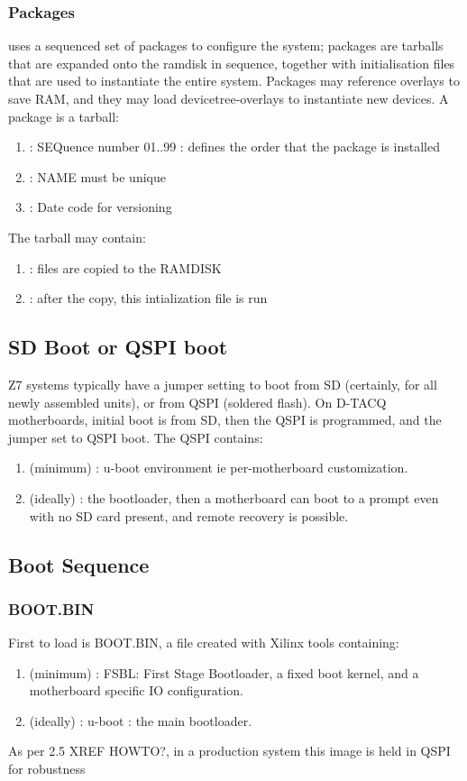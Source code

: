 \documentclass[]{article}
\begin{document}
\subsubsection{Packages}
 uses a sequenced set of packages to configure the system; packages are tarballs that are expanded onto the ramdisk in sequence, together with initialisation files that are used to instantiate the entire system. Packages may reference overlays to save RAM, and they may load devicetree-overlays to instantiate new devices.
A package is a tarball:
\begin{enumerate}
	\item {}	:  SEQuence number 01..99 : defines the order that the package is installed
	\item {}	:  NAME must be unique
	\item {}:   Date code for versioning
\end{enumerate}
The tarball may contain:
\begin{enumerate}
	\item {}   : files are copied to the RAMDISK
	\item {} : after the copy, this intialization file is run
\end{enumerate}

\subsection{SD Boot or QSPI boot}
Z7 systems typically have a jumper setting to boot from SD (certainly, for all newly assembled units), or from QSPI (soldered flash). On D-TACQ motherboards, initial boot is from SD, then the QSPI is programmed, and the jumper set to QSPI boot.
The QSPI contains:
\begin{enumerate}
    \item (minimum) : u-boot environment ie per-motherboard customization.
    \item (ideally) : the bootloader, then a motherboard can boot to a prompt even with no SD card present, and remote recovery is possible.
\end{enumerate}

\subsection{Boot Sequence}

\subsubsection{BOOT.BIN}
First to load is BOOT.BIN, a file created with Xilinx tools containing:
\begin{enumerate}
    \item (minimum) : FSBL: First Stage Bootloader, a fixed boot kernel, and a motherboard specific IO configuration.
    \item (ideally) : u-boot : the main bootloader.
\end{enumerate}
As per 2.5 XREF HOWTO?, in a production system this image is held in QSPI for robustness
\end{document}
